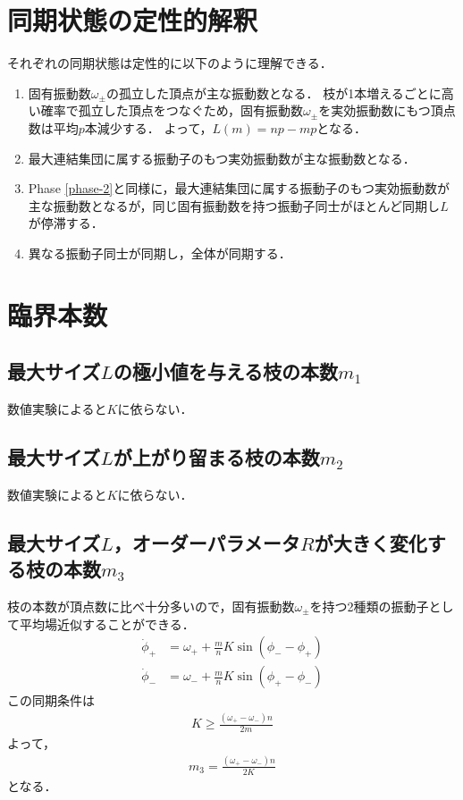 \documentclass[../main]{subfiles}
\begin{document}
\section{同期状態の定性的解釈}
それぞれの同期状態は定性的に以下のように理解できる．
\renewcommand{\labelenumi}{Phase \theenumi}
\begin{enumerate}
    \item 固有振動数$\omega_\pm$の孤立した頂点が主な振動数となる．
    枝が1本増えるごとに高い確率で孤立した頂点をつなぐため，固有振動数$\omega_\pm$を実効振動数にもつ頂点数は平均$p$本減少する．
    よって，$L(m)=np-mp$となる．
    \item \label{phase-2}最大連結集団に属する振動子のもつ実効振動数が主な振動数となる．
    \item Phase \ref{phase-2}と同様に，最大連結集団に属する振動子のもつ実効振動数が主な振動数となるが，同じ固有振動数を持つ振動子同士がほとんど同期し$L$が停滞する．
    \item 異なる振動子同士が同期し，全体が同期する．
\end{enumerate}
\section{臨界本数}
\subsection{最大サイズ$L$の極小値を与える枝の本数$m_1$}
数値実験によると$K$に依らない．
\subsection{最大サイズ$L$が上がり留まる枝の本数$m_2$}
数値実験によると$K$に依らない．
\subsection{最大サイズ$L$，オーダーパラメータ$R$が大きく変化する枝の本数$m_3$}
枝の本数が頂点数に比べ十分多いので，固有振動数$\omega_\pm$を持つ2種類の振動子として平均場近似することができる．
\begin{align*}
    \dot{\phi}_+&=\omega_++\frac{m}{n}K\sin(\phi_--\phi_+)\\
    \dot{\phi}_-&=\omega_-+\frac{m}{n}K\sin(\phi_+-\phi_-)
\end{align*}
この同期条件は
\begin{align*}
    K\geq \frac{(\omega_+-\omega_-)n}{2m}
\end{align*}
よって，
\begin{align*}
    m_3=\frac{(\omega_+-\omega_-)n}{2K}
\end{align*}
となる．
\end{document}

